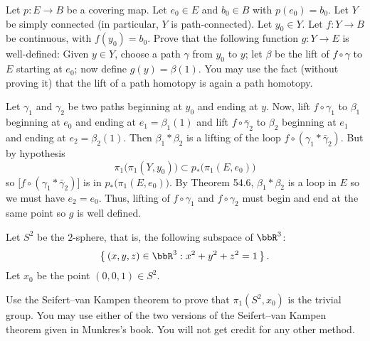 \begin{problem}
  Let \(p\colon E\to B\) be a covering map. Let \(e_0\in E\) and
  \(b_0\in B\) with \(p(e_0)=b_0\). Let \(Y\) be simply connected (in
  particular, \(Y\) is path-connected). Let \(y_0\in Y\). Let
  \(f\colon Y\to B\) be continuous, with \(f(y_0)=b_0\). Prove that the
  following function \(g\colon Y\to E\) is well-defined: Given \(y\in Y\),
  choose a path \(\gamma\) from \(y_0\) to \(y\); let \(\beta\) be the lift
  of \(f\circ\gamma\) to \(E\) starting at \(e_0\); now define
  \(g(y)=\beta(1)\). You may use the fact (without proving it) that the
  lift of a path homotopy is again a path homotopy.
\end{problem}
\begin{solution}
  Let \(\gamma_1\) and \(\gamma_2\) be two paths beginning at \(y_0\) and
  ending at \(y\). Now, lift \(f\circ\gamma_1\) to \(\beta_1\) beginning at
  \(e_0\) and ending at \(e_1=\beta_1(1)\) and lift \(f\circ\bar \gamma_2\)
  to \(\beta_2\) beginning at \(e_1\) and ending at
  \(e_2=\beta_2(1)\). Then \(\beta_1*\beta_2\) is a lifting of the loop
  \(f\circ(\gamma_1*\bar\gamma_2)\). But by hypothesis
  \[
    \pi_1\bigl(\pi_1(Y,y_0)\bigr)\subset p_*\bigl(\pi_1(E,e_0)\bigr)
  \]
  so \(\bigl[f\circ(\gamma_1*\bar \gamma_2)\bigr]\) is in
  \(p_*\bigl(\pi_1(E,e_0)\bigr)\). By Theorem 54.6, \(\beta_1*\beta_2\) is
  a loop in \(E\) so we must have \(e_2=e_0\). Thus,  lifting of
  \(f\circ\gamma_1\) and \(f\circ\gamma_2\) must begin and end at the same
  point so \(g\) is well defined.
\end{solution}

\begin{problem}
  Let \(S^2\) be the \(2\)-sphere, that is, the following subspace of
  \(\bbR^3\):
  \[
    \left\{\,(x,y,z)\in\bbR^3:x^2+y^2+z^2=1\,\right\}.
  \]
  Let \(x_0\) be the point \((0,0,1)\in S^2\).

  Use the Seifert--van Kampen theorem to prove that \(\pi_1(S^2,x_0)\) is
  the trivial group. You may use either of the two versions of the
  Seifert--van Kampen theorem given in Munkres's book. You will not get
  credit for any other method.
\end{problem}
\begin{solution}
\end{solution}

